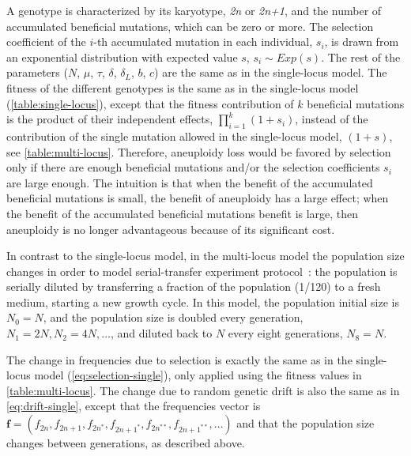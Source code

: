 \documentclass[12pt]{extarticle}
\let\vec\mathbf
\newcommand{\euwt}{\emph{2n}}
\newcommand{\anwt}{\emph{2n+1}}
\begin{document}
A genotype is characterized by its karyotype, \euwt\; or \anwt, and the number of accumulated beneficial mutations, which can be zero or more.
The selection coefficient of the $i$-th accumulated mutation in each individual, $s_i$, is drawn from an exponential distribution with expected value $s$, $s_i \sim Exp(s)$.
The rest of the parameters ($N$, $\mu$, $\tau$, $\delta$, $\delta_L$, $b$, $c$) are the same as in the single-locus model.
The fitness of the different genotypes is the same as in the single-locus model (\autoref{table:single-locus}), except that the fitness contribution of $k$ beneficial mutations is the product of their independent effects, $\prod_{i=1}^k(1+s_i)$, instead of the contribution of the single mutation allowed in the single-locus model, $(1+s)$, see \autoref{table:multi-locus}.
Therefore, aneuploidy loss would be favored by selection only if there are enough beneficial mutations and/or the selection coefficients $s_i$ are large enough. The intuition is that when the benefit of the accumulated beneficial mutations is small, the benefit of aneuploidy has a large effect; when the benefit of the accumulated beneficial mutations benefit is large, then aneuploidy is no longer advantageous because of its significant cost.

In contrast to the single-locus model, in the multi-locus model the population size changes in order to model serial-transfer experiment protocol~\citep{Yona2012}: the population is serially diluted by transferring a fraction of the population (1/120) to a fresh medium, starting a new growth cycle.
In this model, the population initial size is $N_0 = N$, and the population size is doubled every generation, $N_1=2N, N_2=4N, \ldots$, and diluted back to $N$ every eight generations, $N_8=N$.

The change in frequencies due to selection is exactly the same as in the single-locus model (\autoref{eq:selection-single}), only applied using the fitness values in \autoref{table:multi-locus}. The change due to random genetic drift is also the same as in \autoref{eq:drift-single}, except that the frequencies vector is $\vec{f}=(f_{2n}, f_{2n+1}, f_{2n^*}, f_{2n+1^*}, f_{2n^{**}}, f_{2n+1^{**}}, \ldots)$ and that the population size changes between generations, as described above.
\end{document}
